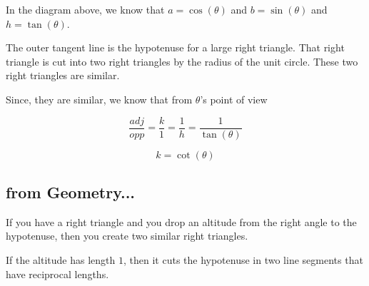 \documentclass{ximera}
\begin{document}
\begin{image}
\end{image}



In the diagram above, we know that $a = \cos(\theta)$ and $b = \sin(\theta)$ and $h = \tan(\theta)$.


The outer tangent line is the hypotenuse for a large right triangle.  That right triangle is cut into two right triangles by the radius of the unit circle.  These two right triangles are similar.






Since, they are similar, we know that from $\theta$'s point of view


\[    \frac{adj}{opp} = \frac{k}{1}   = \frac{1}{h}     = \frac{1}{\tan(\theta)}       \]


\[         k = \cot(\theta)\]










\subsection{from Geometry...}


If you have a right triangle and you drop an altitude from the right angle to the hypotenuse, then you create two similar right triangles.

If the altitude has length $1$, then it cuts the hypotenuse in two line segments that have reciprocal lengths.
\end{document}
